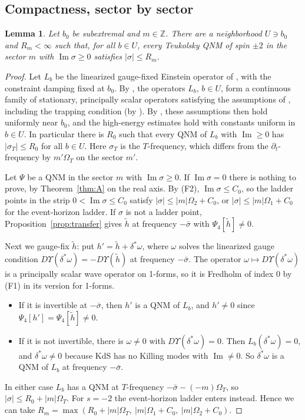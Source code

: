 \documentclass[11pt]{amsart}
\newtheorem{lemma}[theorem]{Lemma}
\theoremstyle{definition}
\theoremstyle{remark}
\numberwithin{equation}{section}
\newcommand{\Z}{\mathbb{Z}}
\renewcommand{\Im}{\operatorname{Im}}
\begin{document}
\subsection{Compactness, sector by sector}
\begin{lemma}\label{lem:compact}
Let $b_0$ be subextremal and $m\in\Z$. There are a neighborhood $U\ni b_0$ and $R_m<\infty$ such that, for all
$b\in U$, every Teukolsky QNM of spin $\pm2$ in the sector $m$ with $\Im\sigma\ge0$ satisfies $|\sigma|\le R_m$.
\end{lemma}

\begin{proof}
Let $L_b$ be the linearized gauge-fixed Einstein operator of \cite[(23)]{HPV25}, with the constraint damping fixed at
$b_0$. By \cite[Remark~2.12 and \S2.5]{HPV25}, the operators $L_b$, $b\in U$, form a continuous family of stationary,
principally scalar operators satisfying the assumptions of \cite[\S5.1]{HV18}, including the trapping condition
(by \cite[Theorem~3.1]{HPV25}). By \cite[\S5.1.2]{HV18}, these assumptions then hold uniformly near $b_0$, and the
high-energy estimates \cite[(5.7), (5.8)]{HV18} hold with constants uniform in $b\in U$. In particular there is $R_0$
such that every QNM of $L_b$ with $\Im\ge0$ has $|\sigma_T|\le R_0$ for all $b\in U$. Here $\sigma_T$
is the $T$-frequency, which differs from the $\partial_t$-frequency by $m'\Omega_T$ on the sector $m'$.

Let $\Psi$ be a QNM in the sector $m$ with $\Im\sigma\ge0$. If $\Im\sigma=0$ there is nothing to prove, by
Theorem~\ref{thm:A} on the real axis. By (F2), $\Im\sigma\le C_0$, so the ladder points in the strip
$0<\Im\sigma\le C_0$ satisfy $|\sigma|\le|m|\Omega_2+C_0$, or $|\sigma|\le|m|\Omega_1+C_0$ for the event-horizon ladder. If $\sigma$ is not a ladder point,
Proposition~\ref{prop:transfer} gives $\tilde h$ at frequency $-\bar\sigma$ with $\Psi_4[\tilde h]\ne0$.

Next we gauge-fix $\tilde h$: put $h'=\tilde h+\delta^*\omega$, where $\omega$ solves the linearized gauge condition
$D\Upsilon(\delta^*\omega)=-D\Upsilon(\tilde h)$ at frequency $-\bar\sigma$. The operator $\omega\mapsto D\Upsilon(\delta^*\omega)$
is a principally scalar wave operator on 1-forms, so it is Fredholm of index $0$ by (F1) in its version for
1-forms.
\begin{itemize}
\item If it is invertible at $-\bar\sigma$, then $h'$ is a QNM of $L_b$, and $h'\ne0$ since $\Psi_4[h']=\Psi_4[\tilde h]\ne0$.
\item If it is not invertible, there is $\omega\ne0$ with $D\Upsilon(\delta^*\omega)=0$. Then
$L_b(\delta^*\omega)=0$, and $\delta^*\omega\ne0$ because KdS has no Killing modes with $\Im\ne0$. So
$\delta^*\omega$ is a QNM of $L_b$ at frequency $-\bar\sigma$.
\end{itemize}
In either case $L_b$ has a QNM at $T$-frequency $-\bar\sigma-(-m)\Omega_T$, so
$|\sigma|\le R_0+|m|\Omega_T$. For $s=-2$ the event-horizon ladder enters instead. Hence we can take
$R_m=\max(R_0+|m|\Omega_T,\ |m|\Omega_1+C_0,\ |m|\Omega_2+C_0)$.
\end{proof}
\end{document}
